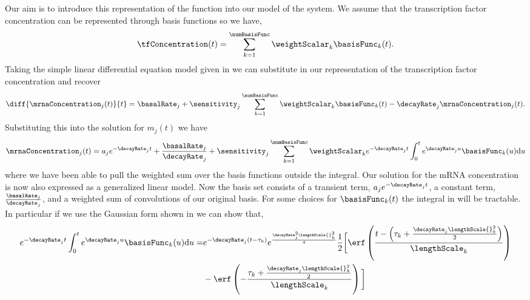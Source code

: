 \documentclass{article}
\begin{document}
Our aim is to introduce this representation of the function into our
model of the system. We assume that the transcription factor
concentration can be represented through basis functions so we have,
\[
\tfConcentration(t) = \sum_{k=1}^\numBasisFunc \weightScalar_k\basisFunc_k(t).
\]
Taking the simple linear differential equation model given in
 we can substitute in our
representation of the transcription factor concentration and recover
\[
\diff{\mrnaConcentration_j(t)}{t} = \basalRate_j + \sensitivity_j \sum_{k=1}^\numBasisFunc \weightScalar_k \basisFunc_k(t) -\decayRate_j \mrnaConcentration_j(t). 
\]
Substituting this into the solution for $m_j(t)$ we have
\begin{equation}
\mrnaConcentration_j(t) = a_je^{-\decayRate_{j}t} + \frac{\basalRate_j}{\decayRate_j} + \sensitivity_j\sum_{k=1}^\numBasisFunc \weightScalar_k e^{-\decayRate_{j}t}\int_0^t e^{\decayRate_{j}u} \basisFunc_k(u) \mathrm{d}u \label{eq:basisFunctionSolution}
\end{equation}
where we have been able to pull the weighted sum over the basis
functions outside the integral. Our solution for the mRNA
concentration is now also expressed as a generalized linear model. Now
the basis set consists of a transient term, $a_je^{-\decayRate_jt}$, a
constant term, $\frac{\basalRate_j}{\decayRate_j}$, and a weighted sum
of convolutions of our original basis. For some choices for
$\basisFunc_k(t)$ the integral in 
will be tractable. In particular if we use the Gaussian form shown in
 we can show that,
 \begin{align*}
 e^{-\decayRate_{j}t}\int_0^t e^{\decayRate_{j}u} \basisFunc_k(u) \mathrm{d}u =& e^{-\decayRate_j(t-\tau_k)}e^{\frac{\decayRate_j^2\lengthScale{}_k^2}{4}}
\frac{1}{2}\bigg[\erf\left(\frac{t-\left(\tau_k+\frac{\decayRate_j\lengthScale{}_k^2}{2}\right)}{\lengthScale_k}\right)\\&-\erf\left(-\frac{\tau_k+\frac{\decayRate_j\lengthScale{}_k^2}{2}}{\lengthScale_k}\right)\bigg]
\end{align*}
\end{document}
